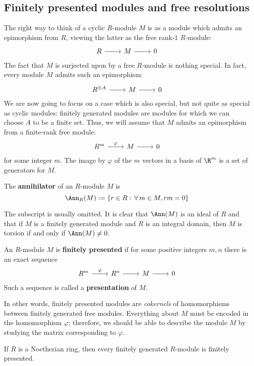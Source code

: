 \subsection{Finitely presented modules and free resolutions}
The right way to think of a cyclic $R$-module $M$ is as a module which admits an epimorphism from $R$, viewing the latter as the free rank-$1$ $R$-module:
\[\begin{tikzcd}
R\ar[r]&M\ar[r]&0
\end{tikzcd}\]
The fact that $M$ is surjected upon by a free $R$-module is nothing special. In fact, every module $M$ admits such an epimorphism:
\[\begin{tikzcd}
R^{\oplus A}\ar[r]&M\ar[r]&0
\end{tikzcd}\]
We are now going to focus on a case which is also special, but not quite as special as cyclic modules: finitely generated modules are modules for which we can choose $A$ to be a finite set. Thus, we will assume that $M$ admits an epimorphism from a finite-rank free module:
\[\begin{tikzcd}
R^{m}\ar[r,"\varphi"]&M\ar[r]&0
\end{tikzcd}\]
for some integer $m$. The image by $\varphi$ of the $m$ vectors in a basis of $\R^m$ is a set of generators for $M$.
\begin{definition}
The \textbf{annihilator} of an $R$-module $M$ is
\[\Ann_R(M):=\{r\in R:\,\forall\,m\in M, rm=0\}\]
\end{definition}
The subscript is usually omitted. It is clear that $\Ann(M)$ is an ideal of $R$ and that if $M$ is a finitely generated module and $R$ is an integral domain, then $M$ is torsion if and only if $\Ann(M)\neq0$.
\begin{definition}
An $R$-module $M$ is \textbf{finitely presented} if for some positive integers $m,n$ there is an exact sequence
\[\begin{tikzcd}
R^{m}\ar[r,"\varphi"]&R^{n}\ar[r]&M\ar[r]&0
\end{tikzcd}\]
Such a sequence is called a \textbf{presentation} of $M$.
\end{definition}
In other words, finitely presented modules are \textit{cokernels} of homomorphisms between finitely generated free modules. Everything about $M$ must be encoded in the homomorphism $\varphi$; therefore, we should be able to describe the module $M$ by studying the matrix corresponding to $\varphi$.
\begin{lemma}\label{Noe fingene finpre}
If $R$ is a Noetherian ring, then every finitely generated $R$-module is finitely presented.
\end{lemma}
